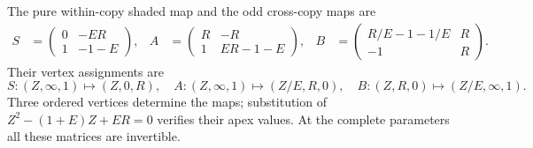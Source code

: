 The pure within-copy shaded map and the odd cross-copy maps are
\begin{equation}\label{cg:shaded}
\begin{aligned}
 S&=\begin{pmatrix}0&-ER\\1&-1-E\end{pmatrix},&
 A&=\begin{pmatrix}R&-R\\1&ER-1-E\end{pmatrix},&
 B&=\begin{pmatrix}R/E-1-1/E&R\\-1&R\end{pmatrix}.
\end{aligned}
\end{equation}
Their vertex assignments are
\[
 S:(Z,\infty,1)\mapsto(Z,0,R),\quad
 A:(Z,\infty,1)\mapsto(Z/E,R,0),\quad
 B:(Z,R,0)\mapsto(Z/E,\infty,1).
\]
Three ordered vertices determine the maps; substitution of
$Z^2-(1+E)Z+ER=0$ verifies their apex values. At the complete
parameters all these matrices are invertible.

